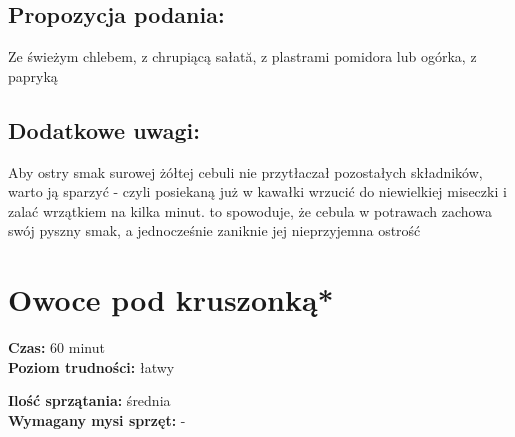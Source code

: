 \documentclass[a4paper,10pt]{book}
\begin{document}
\vspace{0.5cm} 

\small
\section*{Propozycja podania:}
Ze świeżym chlebem, z chrupiącą sałată, z plastrami pomidora lub ogórka, z papryką

\vspace{0.3cm}

\section*{Dodatkowe uwagi:}
Aby ostry smak surowej żółtej cebuli nie przytłaczał pozostałych składników, warto ją sparzyć - czyli posiekaną już w kawałki wrzucić do niewielkiej miseczki i zalać wrzątkiem na kilka minut. to spowoduje, że cebula w potrawach zachowa swój pyszny smak, a jednocześnie zaniknie jej nieprzyjemna ostrość

\chapter{Owoce pod kruszonką*}

\vspace{0.1cm}
\small
\begin{minipage}{0.45\textwidth}
    \noindent \textbf{Czas:} 60 minut \\
    \textbf{Poziom trudności:} łatwy
\end{minipage}
\begin{minipage}{0.45\textwidth}
    \noindent \textbf{Ilość sprzątania:} średnia\\
    \textbf{Wymagany mysi sprzęt:} -
\end{minipage}
\normalsize
\vspace{0.5cm}
\end{document}

